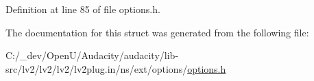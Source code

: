Definition at line 85 of file options.\+h.



The documentation for this struct was generated from the following file\+:\begin{DoxyCompactItemize}
\item 
C\+:/\+\_\+dev/\+Open\+U/\+Audacity/audacity/lib-\/src/lv2/lv2/lv2/lv2plug.\+in/ns/ext/options/\hyperlink{lv2_2lv2_2lv2_2lv2plug_8in_2ns_2ext_2options_2options_8h}{options.\+h}\end{DoxyCompactItemize}
